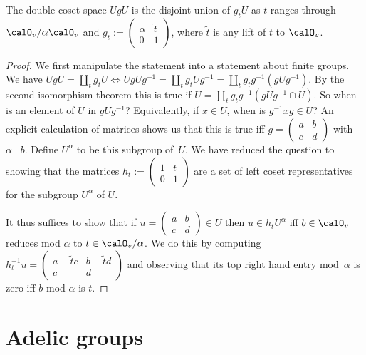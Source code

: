 \begin{lemma}
  \label{bijOn_unipotent_mul_diagU1_U1diagU1}
  \leanok
  The double coset space $UgU$ is the disjoint union of $g_tU$ as $t$ ranges
  through $\calO_v/\alpha\calO_v$ and $g_t:=\begin{pmatrix}\alpha&\tilde{t}\\0&1\end{pmatrix}$,
  where $\tilde{t}$ is any lift of $t$ to $\calO_v$.
\end{lemma}
\begin{proof}
  \leanok
  We first manipulate the statement into a statement about finite groups.
  We have $UgU=\coprod_t g_tU\iff UgUg^{-1}=\coprod_t g_tUg^{-1}=\coprod_t g_tg^{-1}(gUg^{-1})$.
  By the second isomorphism theorem this is true if
  $U=\coprod_t g_tg^{-1}(gUg^{-1}\cap U)$. So when is an element of $U$
  in $gUg^{-1}$? Equivalently, if $x\in U$, when is $g^{-1}xg\in U$? An explicit calculation
  of matrices shows us that this is true iff $g=\begin{pmatrix} a&b\\c&d\end{pmatrix}$ with
  $\alpha\mid b$. Define $U^\alpha$ to be this subgroup of~$U$. We have reduced the question
  to showing that the matrices $h_t:=\begin{pmatrix}1&\tilde{t}\\0&1\end{pmatrix}$
  are a set of left coset representatives for the subgroup $U^\alpha$ of $U$.

  It thus suffices to show that if $u=\begin{pmatrix} a&b\\c&d\end{pmatrix}\in U$
  then $u\in h_tU^\alpha$ iff $b\in\calO_v$ reduces mod $\alpha$ to $t\in\calO_v/\alpha$.
  We do this by computing $h_t^{-1}u=\begin{pmatrix} a-\tilde{t}c&b-\tilde{t}d\\c&d\end{pmatrix}$
  and observing that its top right hand entry mod~$\alpha$ is zero iff $b$ mod $\alpha$ is $t$.
\end{proof}

\section{Adelic groups}

